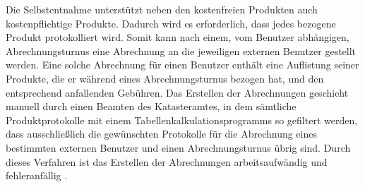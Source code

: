 Die Selbstentnahme unterstützt neben den kostenfreien Produkten auch kostenpflichtige Produkte. Dadurch wird es erforderlich, dass jedes bezogene Produkt protokolliert wird.
Somit kann nach einem, vom Benutzer abhängigen, Abrechnungsturnus eine Abrechnung an die jeweiligen externen Benutzer gestellt werden.
Eine solche Abrechnung für einen Benutzer enthält eine Auflistung seiner Produkte, die er während eines Abrechnungsturnus bezogen hat, und den entsprechend anfallenden Gebühren.
Das Erstellen der Abrechnungen geschieht manuell durch einen Beamten des Katasteramtes, in dem sämtliche Produktprotokolle mit einem Tabellenkalkulationsprogramms so gefiltert werden, dass ausschließlich die gewünschten Protokolle für die Abrechnung eines bestimmten externen Benutzer und einen Abrechnungsturnus übrig sind.
Durch dieses Verfahren ist das Erstellen der Abrechnungen arbeitsaufwändig und fehleranfällig \autocite[vgl.][]{sander-abrechnung}.



